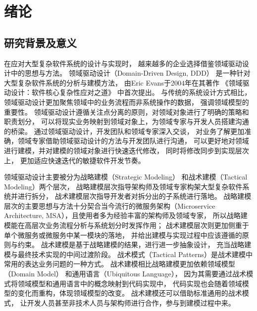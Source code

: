 \chapter{绪论}

\section{研究背景及意义}

在应对大型复杂软件系统的设计与实现时，
越来越多的企业选择借鉴领域驱动设计中的思想与方法。
领域驱动设计（Domain-Driven Design, DDD）
是一种针对大型复杂软件系统的分析与建模方法，
由Eric Evans于2004年在其著作
《领域驱动设计：软件核心复杂性应对之道》\cite{DBLP:books/daglib/0013521}
中首次提出。
与传统的系统设计方式相比，领域驱动设计更加聚焦领域中的业务流程而非系统操作的数据，
强调领域模型的重要性。
领域驱动设计遵循关注点分离的原则，对领域对象进行了明确的策略和职责划分，
可以将现实业务映射到领域对象上，为领域专家与开发人员搭建沟通的桥梁。
通过领域驱动设计，开发团队和领域专家\cite{DBLP:books/daglib/0013521}深入交谈，
对业务了解更加准确，领域专家借助领域驱动设计的方法与开发团队进行沟通，
可以更好地对领域进行建模，并对建模的领域对象进行快速迭代修改，
同时将修改同步到实现层次上，
更加适应快速迭代的敏捷软件开发节奏。

领域驱动设计主要被分为战略建模（Strategic Modeling）
和战术建模（Tactical Modeling）两个层次\cite{millett2015patterns}，
战略建模层次指导架构师及领域专家构架大型复杂软件系统并进行拆分，
战术建模层次指导开发者对拆分出的子系统进行落地。
战略建模层次的主要思想与方法十分契合当今流行的微服务架构（Microservice Architecture, MSA）\cite{nadareishvili2016microservice}，且使用者多为经验丰富的架构师及领域专家，
所以战略建模能在高层次业务流程分析与系统划分时发挥作用；
战术建模层次则更加侧重于单个微服务或微服务中某一模块的落地，
并给出建模与实现过程中应该遵循的原则与约束。
战术建模是基于战略建模的结果，进行进一步抽象设计，
充当战略建模与最终技术实现的中间过渡阶段。
战术模式（Tactical Patterns）是战术建模中常用的表达业务问题的一种方式。
战术建模相比战略建模更加依赖领域模型（Domain Model）\cite{vernon2013implementing}
和通用语言（Ubiquitous Language）\cite{vernon2013implementing}，
因为其需要通过战术模式将领域模型和通用语言中的概念映射到代码实现中，
代码实现也会随着领域模型的变化而重构，体现领域模型的改变。
战术建模还可以借助标准通用的战术模式，
让开发人员甚至非技术人员与架构师进行合作，参与到建模过程中来。


